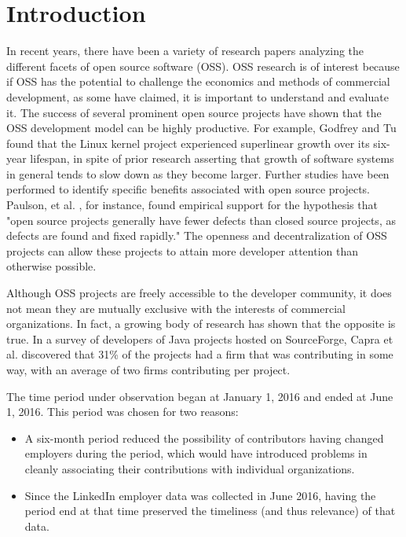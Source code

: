 \chapter{Introduction}
In recent years, there have been a variety of research papers analyzing the different facets of open source software (OSS). OSS research is of interest because if OSS has the potential to challenge the economics and methods of commercial development, as some have claimed, it is important to understand and evaluate it\cite{mockus2002two}. The success of several prominent open source projects have shown that the OSS development model can be highly productive. For example, Godfrey and Tu \cite{godfrey2000evolution} found that the Linux kernel project experienced superlinear growth over its six-year lifespan, in spite of prior research asserting that growth of software systems in general tends to slow down as they become larger. Further studies have been performed to identify specific benefits associated with open source projects. Paulson, et al. \cite{paulson2004empirical}, for instance, found empirical support for the hypothesis that "open source projects generally have fewer defects than closed source projects, as defects are found and fixed rapidly." The openness and decentralization of OSS projects can allow these projects to attain more developer attention than otherwise possible.

Although OSS projects are freely accessible to the developer community, it does not mean they are mutually exclusive with the interests of commercial organizations. In fact, a growing body of research has shown that the opposite is true. In a survey of developers of Java projects hosted on SourceForge, Capra et al. discovered that 31\% of the projects had a firm that was contributing in some way, with an average of two firms contributing per project\cite{capra2009survey}.

The time period \timeperiod{} under observation began at January 1, 2016 and ended at June 1, 2016. This period was chosen for two reasons:
\begin{itemize}
	\item A six-month period reduced the possibility of contributors having changed employers during the period, which would have introduced problems in cleanly associating their contributions with individual organizations.
	\item Since the LinkedIn employer data was collected in June 2016, having the period end at that time preserved the timeliness (and thus relevance) of that data.
\end{itemize}
